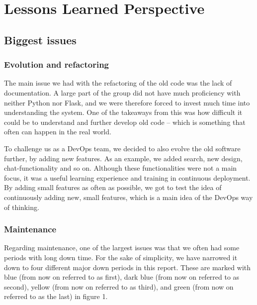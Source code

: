 \section{Lessons Learned Perspective}
\subsection{Biggest issues}
\subsubsection{Evolution and refactoring}
The main issue we had with the refactoring of the old code was the lack of documentation. A large part of the group did not have much proficiency with neither Python nor Flask, and we were therefore forced to invest much time into understanding the system. One of the takeaways from this was how difficult it could be to understand and further develop old code – which is something that often can happen in the real world.

To challenge us as a DevOps team, we decided to also evolve the old software further, by adding new features. As an example, we added search, new design, chat-functionality and so on. Although these functionalities were not a main focus, it was a useful learning experience and training in continuous deployment. By adding small features as often as possible, we got to test the idea of continuously adding new, small features, which is a main idea of the DevOps way of thinking.

\subsubsection{Maintenance}

Regarding maintenance, one of the largest issues was that we often had some periods with long down time. For the sake of simplicity, we have narrowed it down to four different major down periods in this report. These are marked with blue (from now on referred to as first), dark blue (from now on referred to as second), yellow (from now on referred to as third), and green (from now on referred to as the last) in figure 1. 


